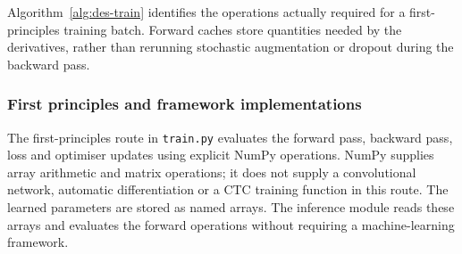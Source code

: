 Algorithm~\ref{alg:des-train} identifies the operations actually required for a first-principles training batch. Forward caches store quantities needed by the derivatives, rather than rerunning stochastic augmentation or dropout during the backward pass.
\begin{designalgorithm}
\caption{One numerical training batch and validation checkpoint decision}
\label{alg:des-train}
\begin{designpseudo}
\end{designpseudo}
\end{designalgorithm}

\subsubsection{First principles and framework implementations}
\label{sec:des-implementations}
The first-principles route in \texttt{train.py} evaluates the forward pass, backward pass, loss and optimiser updates using explicit NumPy operations. NumPy supplies array arithmetic and matrix operations; it does not supply a convolutional network, automatic differentiation or a CTC training function in this route. The learned parameters are stored as named arrays. The inference module reads these arrays and evaluates the forward operations without requiring a machine-learning framework.


